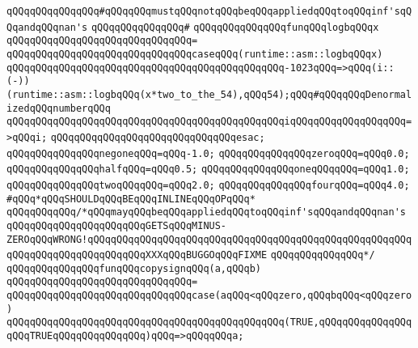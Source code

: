 \verb|qQQqqQQqqQQqqQQq#qQQqqQQqmustqQQqnotqQQqbeqQQqappliedqQQqtoqQQqinf'sqQQqandqQQqnan's|\newline
\verb|qQQqqQQqqQQqqQQq#|\newline
\verb|qQQqqQQqqQQqqQQqfunqQQqlogbqQQqx|\newline
\verb|qQQqqQQqqQQqqQQqqQQqqQQqqQQqqQQq=|\newline
\verb|qQQqqQQqqQQqqQQqqQQqqQQqqQQqqQQqcaseqQQq(runtime::asm::logbqQQqx)|\newline
\verb|qQQqqQQqqQQqqQQqqQQqqQQqqQQqqQQqqQQqqQQqqQQqqQQq-1023qQQq=>qQQq(i::(-))(runtime::asm::logbqQQq(x*two_to_the_54),qQQq54);qQQq#qQQqqQQqDenormalizedqQQqnumberqQQq|\newline
\verb|qQQqqQQqqQQqqQQqqQQqqQQqqQQqqQQqqQQqqQQqqQQqqQQqiqQQqqQQqqQQqqQQqqQQq=>qQQqi;|\newline
\verb|qQQqqQQqqQQqqQQqqQQqqQQqqQQqqQQqesac;|\newline
\newline
\newline
\verb|qQQqqQQqqQQqqQQqnegoneqQQq=qQQq-1.0;|\newline
\newline
\verb|qQQqqQQqqQQqqQQqzeroqQQq=qQQq0.0;|\newline
\verb|qQQqqQQqqQQqqQQqhalfqQQq=qQQq0.5;|\newline
\verb|qQQqqQQqqQQqqQQqoneqQQqqQQq=qQQq1.0;|\newline
\verb|qQQqqQQqqQQqqQQqtwoqQQqqQQq=qQQq2.0;|\newline
\verb|qQQqqQQqqQQqqQQqfourqQQq=qQQq4.0;|\newline
\newline
\verb|#qQQq*qQQqSHOULDqQQqBEqQQqINLINEqQQqOPqQQq*|\newline
\verb|qQQqqQQqqQQq/*qQQqmayqQQqbeqQQqappliedqQQqtoqQQqinf'sqQQqandqQQqnan's|\newline
\verb|qQQqqQQqqQQqqQQqqQQqqQQqGETSqQQqMINUS-ZEROqQQqWRONG!qQQqqQQqqQQqqQQqqQQqqQQqqQQqqQQqqQQqqQQqqQQqqQQqqQQqqQQqqQQqqQQqqQQqqQQqqQQqqQQqXXXqQQqBUGGOqQQqFIXME|\newline
\verb|qQQqqQQqqQQqqQQq*/|\newline
\verb|qQQqqQQqqQQqqQQqfunqQQqcopysignqQQq(a,qQQqb)|\newline
\verb|qQQqqQQqqQQqqQQqqQQqqQQqqQQqqQQq=|\newline
\verb|qQQqqQQqqQQqqQQqqQQqqQQqqQQqqQQqcase(aqQQq<qQQqzero,qQQqbqQQq<qQQqzero)|\newline
\verb|qQQqqQQqqQQqqQQqqQQqqQQqqQQqqQQqqQQqqQQqqQQqqQQq(TRUE,qQQqqQQqqQQqqQQqqQQqTRUEqQQqqQQqqQQqqQQq)qQQq=>qQQqqQQqa;|\newline
